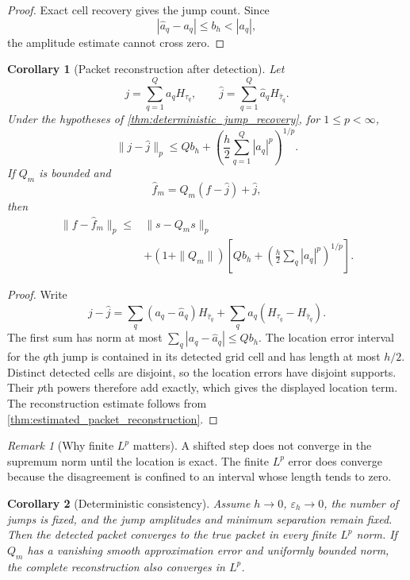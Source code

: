 \documentclass{aomart}
\newtheorem{corollary}[corollary]{Corollary}
\theoremstyle{definition}
\theoremstyle{remark}
\newtheorem{remark}[remark]{Remark}
\begin{document}
\begin{proof}
Exact cell recovery gives the jump count. Since
\[
|\widehat a_q-a_q|\leq b_h<|a_q|,
\]
the amplitude estimate cannot cross zero.
\end{proof}

\begin{corollary}[Packet reconstruction after detection]\label{cor:reconstruction_after_detection}
Let
\[
j=\sum_{q=1}^{Q}a_qH_{\tau_q},
\qquad
\widehat j=\sum_{q=1}^{Q}\widehat a_qH_{\widehat\tau_q}.
\]
Under the hypotheses of \cref{thm:deterministic_jump_recovery}, for \(1\leq p<\infty\),
\[
\|j-\widehat j\|_p
\leq
Qb_h
+
\left(
\frac h2\sum_{q=1}^{Q}|a_q|^p
\right)^{1/p}.
\]
If \(Q_m\) is bounded and
\[
\widehat f_m=Q_m(f-\widehat j)+\widehat j,
\]
then
\[
\begin{aligned}
\|f-\widehat f_m\|_p
\leq{}&
\|s-Q_ms\|_p\\
&+(1+\|Q_m\|)
\left[
Qb_h+
\left(
\frac h2\sum_q|a_q|^p
\right)^{1/p}
\right].
\end{aligned}
\]
\end{corollary}

\begin{proof}
Write
\[
j-\widehat j
=
\sum_q(a_q-\widehat a_q)H_{\widehat\tau_q}
+
\sum_q a_q(H_{\tau_q}-H_{\widehat\tau_q}).
\]
The first sum has norm at most \(\sum_q|a_q-\widehat a_q|\leq Qb_h\). The location error interval for the \(q\)th jump is contained in its detected grid cell and has length at most \(h/2\). Distinct detected cells are disjoint, so the location errors have disjoint supports. Their \(p\)th powers therefore add exactly, which gives the displayed location term. The reconstruction estimate follows from \cref{thm:estimated_packet_reconstruction}.
\end{proof}

\begin{remark}[Why finite \(L^p\) matters]\label{rem:finite_p_recovery}
A shifted step does not converge in the supremum norm until the location is exact. The finite \(L^p\) error does converge because the disagreement is confined to an interval whose length tends to zero.
\end{remark}

\begin{corollary}[Deterministic consistency]\label{cor:deterministic_consistency}
Assume \(h\to0\), \(\varepsilon_h\to0\), the number of jumps is fixed, and the jump amplitudes and minimum separation remain fixed. Then the detected packet converges to the true packet in every finite \(L^p\) norm. If \(Q_m\) has a vanishing smooth approximation error and uniformly bounded norm, the complete reconstruction also converges in \(L^p\).
\end{corollary}
\end{document}
